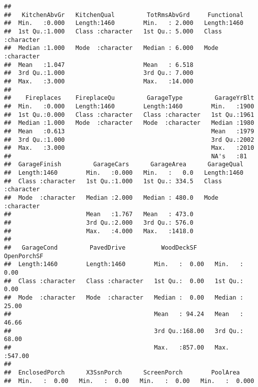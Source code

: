 \documentclass[
]{article}
\begin{document}
\begin{verbatim}
##                                                                    
##   KitchenAbvGr   KitchenQual         TotRmsAbvGrd     Functional       
##  Min.   :0.000   Length:1460        Min.   : 2.000   Length:1460       
##  1st Qu.:1.000   Class :character   1st Qu.: 5.000   Class :character  
##  Median :1.000   Mode  :character   Median : 6.000   Mode  :character  
##  Mean   :1.047                      Mean   : 6.518                     
##  3rd Qu.:1.000                      3rd Qu.: 7.000                     
##  Max.   :3.000                      Max.   :14.000                     
##                                                                        
##    Fireplaces    FireplaceQu         GarageType         GarageYrBlt  
##  Min.   :0.000   Length:1460        Length:1460        Min.   :1900  
##  1st Qu.:0.000   Class :character   Class :character   1st Qu.:1961  
##  Median :1.000   Mode  :character   Mode  :character   Median :1980  
##  Mean   :0.613                                         Mean   :1979  
##  3rd Qu.:1.000                                         3rd Qu.:2002  
##  Max.   :3.000                                         Max.   :2010  
##                                                        NA's   :81    
##  GarageFinish         GarageCars      GarageArea      GarageQual       
##  Length:1460        Min.   :0.000   Min.   :   0.0   Length:1460       
##  Class :character   1st Qu.:1.000   1st Qu.: 334.5   Class :character  
##  Mode  :character   Median :2.000   Median : 480.0   Mode  :character  
##                     Mean   :1.767   Mean   : 473.0                     
##                     3rd Qu.:2.000   3rd Qu.: 576.0                     
##                     Max.   :4.000   Max.   :1418.0                     
##                                                                        
##   GarageCond         PavedDrive          WoodDeckSF      OpenPorchSF    
##  Length:1460        Length:1460        Min.   :  0.00   Min.   :  0.00  
##  Class :character   Class :character   1st Qu.:  0.00   1st Qu.:  0.00  
##  Mode  :character   Mode  :character   Median :  0.00   Median : 25.00  
##                                        Mean   : 94.24   Mean   : 46.66  
##                                        3rd Qu.:168.00   3rd Qu.: 68.00  
##                                        Max.   :857.00   Max.   :547.00  
##                                                                         
##  EnclosedPorch      X3SsnPorch      ScreenPorch        PoolArea      
##  Min.   :  0.00   Min.   :  0.00   Min.   :  0.00   Min.   :  0.000  

\end{verbatim}
\end{document}
